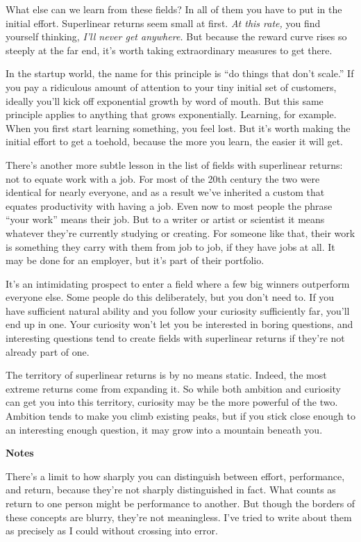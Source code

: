What else can we learn from these fields? In all of them you have to put
in the initial effort. Superlinear returns seem small at first. \emph{At
this rate,} you find yourself thinking, \emph{I'll never get anywhere.}
But because the reward curve rises so steeply at the far end, it's worth
taking extraordinary measures to get there.

In the startup world, the name for this principle is ``do things that
don't scale.'' If you pay a ridiculous amount of attention to your tiny
initial set of customers, ideally you'll kick off exponential growth by
word of mouth. But this same principle applies to anything that grows
exponentially. Learning, for example. When you first start learning
something, you feel lost. But it's worth making the initial effort to
get a toehold, because the more you learn, the easier it will get.

There's another more subtle lesson in the list of fields with
superlinear returns: not to equate work with a job. For most of the 20th
century the two were identical for nearly everyone, and as a result
we've inherited a custom that equates productivity with having a job.
Even now to most people the phrase ``your work'' means their job. But to
a writer or artist or scientist it means whatever they're currently
studying or creating. For someone like that, their work is something
they carry with them from job to job, if they have jobs at all. It may
be done for an employer, but it's part of their portfolio.

It's an intimidating prospect to enter a field where a few big winners
outperform everyone else. Some people do this deliberately, but you
don't need to. If you have sufficient natural ability and you follow
your curiosity sufficiently far, you'll end up in one. Your curiosity
won't let you be interested in boring questions, and interesting
questions tend to create fields with superlinear returns if they're not
already part of one.

The territory of superlinear returns is by no means static. Indeed, the
most extreme returns come from expanding it. So while both ambition and
curiosity can get you into this territory, curiosity may be the more
powerful of the two. Ambition tends to make you climb existing peaks,
but if you stick close enough to an interesting enough question, it may
grow into a mountain beneath you.

\textbf{Notes}

There's a limit to how sharply you can distinguish between effort,
performance, and return, because they're not sharply distinguished in
fact. What counts as return to one person might be performance to
another. But though the borders of these concepts are blurry, they're
not meaningless. I've tried to write about them as precisely as I could
without crossing into error.

